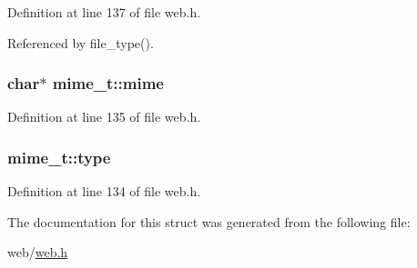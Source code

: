 Definition at line 137 of file web.\-h.



Referenced by file\-\_\-type().

\hypertarget{structmime__t_ad796d16eaee60d7435bff66b2e9b8a8d}{
\subsubsection[{mime}]{\setlength{\rightskip}{0pt plus 5cm}char$\ast$ mime\-\_\-t\-::mime}}\label{structmime__t_ad796d16eaee60d7435bff66b2e9b8a8d}


Definition at line 135 of file web.\-h.

\hypertarget{structmime__t_ae69826dcfd475d65fa0fe8a1574bb3af}{
\subsubsection[{type}]{ mime\-\_\-t\-::type}}\label{structmime__t_ae69826dcfd475d65fa0fe8a1574bb3af}


Definition at line 134 of file web.\-h.



The documentation for this struct was generated from the following file\-:\begin{DoxyCompactItemize}
\item 
web/\hyperlink{web_8h}{web.\-h}\end{DoxyCompactItemize}
